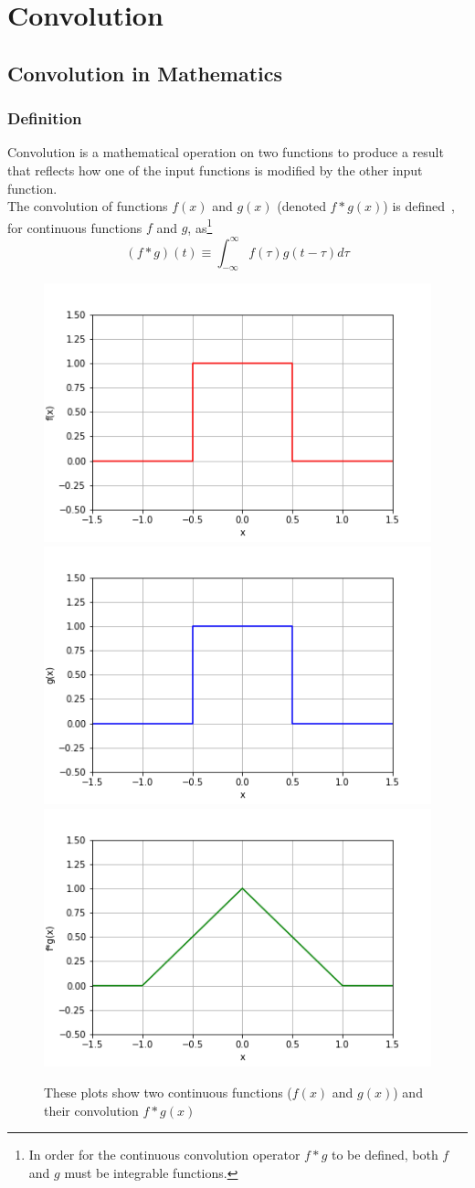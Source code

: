 \chapter[Convolution]{Convolution}
\label{ch:convolution}
\section{Convolution in Mathematics}
\label{sec:convolution:mathematics}
\subsection{Definition}
\label{sec:convolution:mathematics:definitions}
Convolution is a mathematical operation on two functions to produce a result that reflects how one of the input functions is modified by the other input function.\\
The convolution of functions $f(x)$ and $g(x)$ (denoted $f*g(x)$) is defined~\citep{Bracewell2000}, for continuous functions $f$ and $g$, as\footnote{In order for the continuous convolution operator $f * g$ to be defined, both $f$ and $g$ must be integrable functions.}
\begin{equation}
(f * g) (t)\equiv\int_{-\infty}^{\infty} f(\tau) g(t-\tau)d\tau
\end{equation}
\begin{figure}[ht]
    \includegraphics[width=.32\linewidth]{graphics/convolution/convolution_continuos_f_gebs.png}
    \includegraphics[width=.32\linewidth]{graphics/convolution/convolution_continuos_g_gebs.png}
    \includegraphics[width=.32\linewidth]{graphics/convolution/convolution_continuos_fg_gebs.png}
    \caption{These plots show two continuous functions ($f(x)$ and $g(x)$) and their convolution $f*g(x)$}
    \label{fig:continuousconvolution}
\end{figure}
